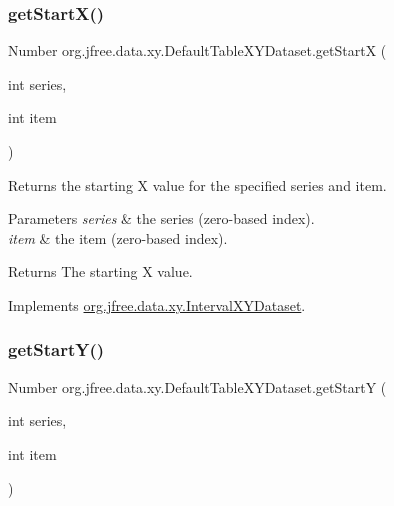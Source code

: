 \subsubsection{\texorpdfstring{get\+Start\+X()}{getStartX()}}
{\footnotesize\ttfamily Number org.\+jfree.\+data.\+xy.\+Default\+Table\+X\+Y\+Dataset.\+get\+StartX (\begin{DoxyParamCaption}\item[{int}]{series,  }\item[{int}]{item }\end{DoxyParamCaption})}

Returns the starting X value for the specified series and item.


\begin{DoxyParams}{Parameters}
{\em series} & the series (zero-\/based index). \\
\hline
{\em item} & the item (zero-\/based index).\\
\hline
\end{DoxyParams}
\begin{DoxyReturn}{Returns}
The starting X value. 
\end{DoxyReturn}


Implements \mbox{\hyperlink{interfaceorg_1_1jfree_1_1data_1_1xy_1_1_interval_x_y_dataset_a7548ec7d60d72463313dc6f10aceee62}{org.\+jfree.\+data.\+xy.\+Interval\+X\+Y\+Dataset}}.

\mbox{\label{classorg_1_1jfree_1_1data_1_1xy_1_1_default_table_x_y_dataset_ad447b9f576948e9b3e7d4ba78c848558}} 
\subsubsection{\texorpdfstring{get\+Start\+Y()}{getStartY()}}
{\footnotesize\ttfamily Number org.\+jfree.\+data.\+xy.\+Default\+Table\+X\+Y\+Dataset.\+get\+StartY (\begin{DoxyParamCaption}\item[{int}]{series,  }\item[{int}]{item }\end{DoxyParamCaption})}

